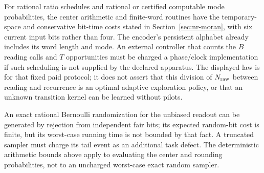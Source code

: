 For rational ratio schedules and rational or certified computable mode probabilities, the center arithmetic and finite-word routines have the temporary-space and conservative bit-time costs stated in Section~\ref{sec:nr-moran}, with six current input bits rather than four. The encoder's persistent alphabet already includes its word length and mode. An external controller that counts the $B$ reading calls and $T$ opportunities must be charged a phase/clock implementation if such scheduling is not supplied by the declared apparatus. The displayed law is for that fixed paid protocol; it does not assert that this division of $N_{\rm raw}$ between reading and recurrence is an optimal adaptive exploration policy, or that an unknown transition kernel can be learned without pilots.

An exact rational Bernoulli randomization for the unbiased readout can be generated by rejection from independent fair bits; its expected random-bit cost is finite, but its worst-case running time is not bounded by that fact. A truncated sampler must charge its tail event as an additional task defect. The deterministic arithmetic bounds above apply to evaluating the center and rounding probabilities, not to an uncharged worst-case exact random sampler.
